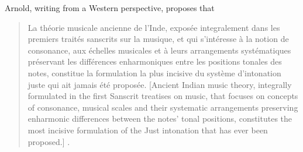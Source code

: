 Arnold, writing from a Western perspective, proposes that \begin{quotation}La théorie musicale ancienne de l'Inde, exposée integralement dans les premiers traités sanscrits sur la musique, et qui s'intéresse à la notion de consonance, aux échelles musicales et à leurs arrangements systématiques préservant les différences enharmoniques entre les positions tonales des notes, constitue la formulation la plus incisive du système d'intonation juste qui ait jamais été proposée. [Ancient Indian music theory, integrally formulated in the first Sanscrit treatises on music, that focuses on concepts of consonance, musical scales and their systematic arrangements preserving enharmonic differences between the notes’ tonal positions, constitutes the most incisive formulation of the Just intonation that has ever been proposed.] \cite[my translation from French][p.~11]{arnold1985intonation}.\end{quotation}


